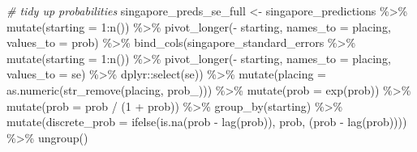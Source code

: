 \documentclass[
]{book}
\newenvironment{Shaded}{\begin{snugshade}}{\end{snugshade}}
\newcommand{\AttributeTok}[1]{\textcolor[rgb]{0.77,0.63,0.00}{#1}}
\newcommand{\CommentTok}[1]{\textcolor[rgb]{0.56,0.35,0.01}{\textit{#1}}}
\newcommand{\DecValTok}[1]{\textcolor[rgb]{0.00,0.00,0.81}{#1}}
\newcommand{\FunctionTok}[1]{\textcolor[rgb]{0.00,0.00,0.00}{#1}}
\newcommand{\NormalTok}[1]{#1}
\newcommand{\OtherTok}[1]{\textcolor[rgb]{0.56,0.35,0.01}{#1}}
\newcommand{\SpecialCharTok}[1]{\textcolor[rgb]{0.00,0.00,0.00}{#1}}
\newcommand{\StringTok}[1]{\textcolor[rgb]{0.31,0.60,0.02}{#1}}
\begin{document}
\begin{Shaded}
\begin{Highlighting}[]
\CommentTok{\# tidy up probabilities}
\NormalTok{singapore\_preds\_se\_full }\OtherTok{\textless{}{-}}\NormalTok{ singapore\_predictions }\SpecialCharTok{\%\textgreater{}\%}
  \FunctionTok{mutate}\NormalTok{(}\AttributeTok{starting =} \DecValTok{1}\SpecialCharTok{:}\FunctionTok{n}\NormalTok{()) }\SpecialCharTok{\%\textgreater{}\%}
  \FunctionTok{pivot\_longer}\NormalTok{(}\SpecialCharTok{{-}}\NormalTok{ starting, }\AttributeTok{names\_to =} \StringTok{\textquotesingle{}placing\textquotesingle{}}\NormalTok{, }\AttributeTok{values\_to =} \StringTok{\textquotesingle{}prob\textquotesingle{}}\NormalTok{) }\SpecialCharTok{\%\textgreater{}\%} 
  \FunctionTok{bind\_cols}\NormalTok{(singapore\_standard\_errors }\SpecialCharTok{\%\textgreater{}\%} \FunctionTok{mutate}\NormalTok{(}\AttributeTok{starting =} \DecValTok{1}\SpecialCharTok{:}\FunctionTok{n}\NormalTok{()) }\SpecialCharTok{\%\textgreater{}\%}
  \FunctionTok{pivot\_longer}\NormalTok{(}\SpecialCharTok{{-}}\NormalTok{ starting, }\AttributeTok{names\_to =} \StringTok{\textquotesingle{}placing\textquotesingle{}}\NormalTok{, }\AttributeTok{values\_to =} \StringTok{\textquotesingle{}se\textquotesingle{}}\NormalTok{) }\SpecialCharTok{\%\textgreater{}\%}
\NormalTok{    dplyr}\SpecialCharTok{::}\FunctionTok{select}\NormalTok{(se)) }\SpecialCharTok{\%\textgreater{}\%}
  \FunctionTok{mutate}\NormalTok{(}\AttributeTok{placing =} \FunctionTok{as.numeric}\NormalTok{(}\FunctionTok{str\_remove}\NormalTok{(placing, }\StringTok{\textquotesingle{}prob\_\textquotesingle{}}\NormalTok{))) }\SpecialCharTok{\%\textgreater{}\%}
  \FunctionTok{mutate}\NormalTok{(}\AttributeTok{prob =} \FunctionTok{exp}\NormalTok{(prob)) }\SpecialCharTok{\%\textgreater{}\%}
  \FunctionTok{mutate}\NormalTok{(}\AttributeTok{prob =}\NormalTok{ prob }\SpecialCharTok{/}\NormalTok{ (}\DecValTok{1} \SpecialCharTok{+}\NormalTok{ prob)) }\SpecialCharTok{\%\textgreater{}\%}
  \FunctionTok{group\_by}\NormalTok{(starting) }\SpecialCharTok{\%\textgreater{}\%} 
  \FunctionTok{mutate}\NormalTok{(}\AttributeTok{discrete\_prob =} \FunctionTok{ifelse}\NormalTok{(}\FunctionTok{is.na}\NormalTok{(prob }\SpecialCharTok{{-}} \FunctionTok{lag}\NormalTok{(prob)), prob, (prob }\SpecialCharTok{{-}} \FunctionTok{lag}\NormalTok{(prob)))) }\SpecialCharTok{\%\textgreater{}\%}
  \FunctionTok{ungroup}\NormalTok{()}


\end{Highlighting}
\end{Shaded}
\end{document}
